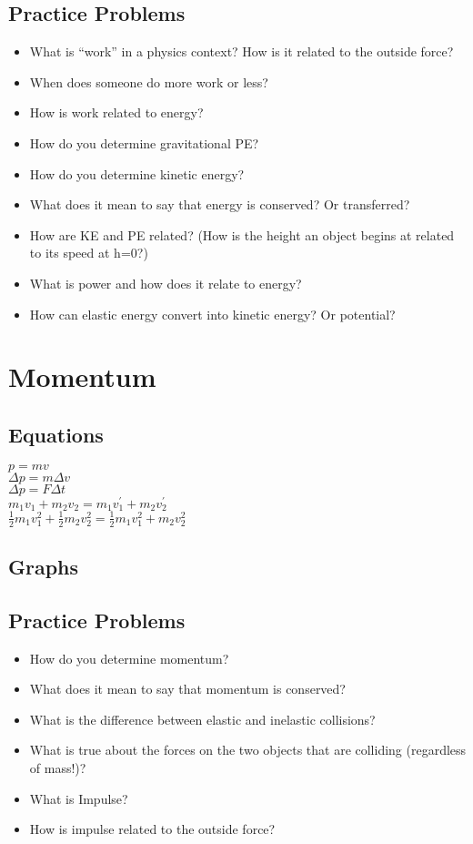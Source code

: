 \documentclass[11pt]{article}
\begin{document}
\subsection*{Practice Problems}
\label{sec:org5794f86}
\begin{itemize}
\item What is “work” in a physics context?  How is it related to the outside force?
\item When does someone do more work or less?
\item How is work related to energy?
\item How do you determine gravitational PE?
\item How do you determine kinetic energy?
\item What does it mean to say that energy is conserved? Or transferred?
\item How are KE and PE related? (How is the height an object begins at related to its speed at h=0?)
\item What is power and how does it relate to energy?
\item How can elastic energy convert into kinetic energy? Or potential?
\end{itemize}
\section*{Momentum}
\label{sec:orgdab7561}
\subsection*{Equations}
\label{sec:org24f08d2}
\(p=mv\) \\
\(\Delta p =m \Delta v\) \\
\(\Delta p = F \Delta t\) \\
\(m_1v_1+m_2v_2=m_1v_1^\prime + m_2v_2^\prime\) \\
\(\frac12 m_1v_1^2+\frac12m_2v_2^2 = \frac12 m_1v_1^2 + m_2v_2^2\) \\
\subsection*{Graphs}
\label{sec:orgc94d761}
\subsection*{Practice Problems}
\label{sec:org215e136}
\begin{itemize}
\item How do you determine momentum?
\item What does it mean to say that momentum is conserved?
\item What is the difference between elastic and inelastic collisions?
\item What is true about the forces on the two objects that are colliding (regardless of mass!)?
\item What is Impulse?
\item How is impulse related to the outside force?
\end{itemize}
\end{document}
